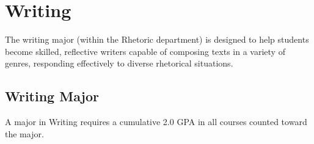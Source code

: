\documentclass[
  letterpaper,
]{scrbook}
\begin{document}
\section{Writing}\label{sec-writing}

The writing major (within the Rhetoric department) is designed to help
students become skilled, reflective writers capable of composing texts
in a variety of genres, responding effectively to diverse rhetorical
situations.

\subsection{Writing Major}\label{writing-major}

A major in Writing requires a cumulative 2.0 GPA in all courses counted
toward the major.
\end{document}
